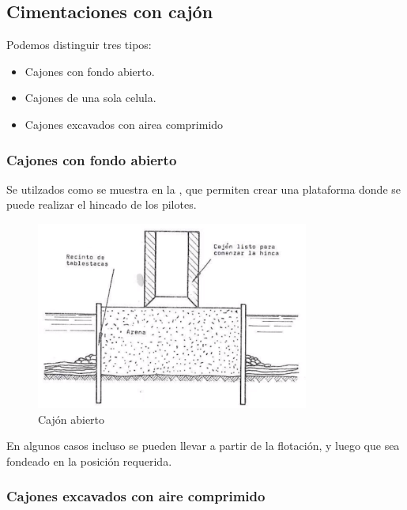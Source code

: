 \documentclass[../main.tex]{subfiles}
\begin{document}
\subsection{Cimentaciones con cajón}

Podemos distinguir tres tipos:

\begin{itemize}
  \item Cajones con fondo abierto.
  \item Cajones de una sola celula.
  \item Cajones excavados con airea comprimido
\end{itemize}


\subsubsection{Cajones con fondo abierto}

Se utilzados como se muestra en la , que permiten crear
una plataforma donde se puede realizar el hincado de los pilotes.

\begin{figure}[ht]
  \centering
  \includegraphics[width=0.8\textwidth]{../images/20210419/cajon-abierto}
  \caption{Cajón abierto}
  \label{fig:cajon-abierto}
\end{figure}

En algunos casos incluso se pueden llevar a partir de la flotación, y luego que
sea fondeado en la posición requerida.


\subsubsection{Cajones excavados con aire comprimido}
\end{document}
